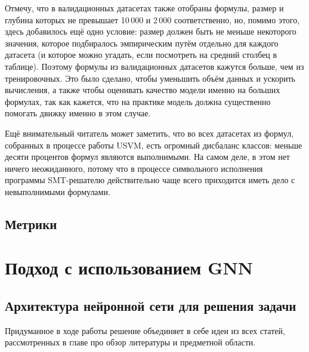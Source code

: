 Отмечу, что в валидационных датасетах также отобраны формулы, размер и глубина которых не превышает 10\,000 и 2\,000 соответственно, но, помимо этого, здесь добавилось ещё одно условие: размер должен быть не меньше некоторого значения, которое подбиралось эмпирическим путём отдельно для каждого датасета (и которое можно угадать, если посмотреть на средний столбец в таблице). Поэтому формулы из валидационных датасетов кажутся больше, чем из тренировочных. Это было сделано, чтобы уменьшить объём данных и ускорить вычисления, а также чтобы оценивать качество модели именно на больших формулах, так как кажется, что на практике модель должна существенно помогать движку именно в этом случае.

Ещё внимательный читатель может заметить, что во всех датасетах из формул, собранных в процессе работы USVM, есть огромный дисбаланс классов: меньше десяти процентов формул являются выполнимыми. На самом деле, в этом нет ничего неожиданного, потому что в процессе символьного исполнения программы SMT-решателю действительно чаще всего приходится иметь дело с невыполнимыми формулами.


\subsection{Метрики}



\newpage

\section{Подход с использованием GNN}

\subsection{Архитектура нейронной сети для решения задачи}

Придуманное в ходе работы решение объединяет в себе идеи из всех статей, рассмотренных в главе про обзор литературы и предметной области.

